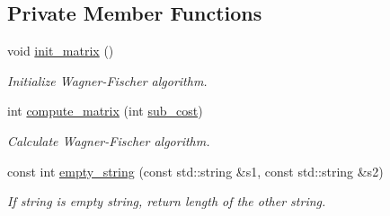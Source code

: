 \subsection*{Private Member Functions}
\begin{DoxyCompactItemize}
\item 
void \hyperlink{class_edit_distance_a72c36c3a9eef6e44a4aaf5f122c9f522}{init\+\_\+matrix} ()
\begin{DoxyCompactList}\small\item\em Initialize Wagner-\/\+Fischer algorithm. \end{DoxyCompactList}\item 
int \hyperlink{class_edit_distance_a4cf2f4dbbd5def5f4e7d1032ac9e2b3f}{compute\+\_\+matrix} (int \hyperlink{class_edit_distance_a8d220afccf33fade211f6152651f7f27}{sub\+\_\+cost})
\begin{DoxyCompactList}\small\item\em Calculate Wagner-\/\+Fischer algorithm. \end{DoxyCompactList}\item 
const int \hyperlink{class_edit_distance_a427c3e65e49d0510aeb04c1d63e48e42}{empty\+\_\+string} (const std\+::string \&s1, const std\+::string \&s2)
\begin{DoxyCompactList}\small\item\em If string is empty string, return length of the other string. \end{DoxyCompactList}\end{DoxyCompactItemize}
